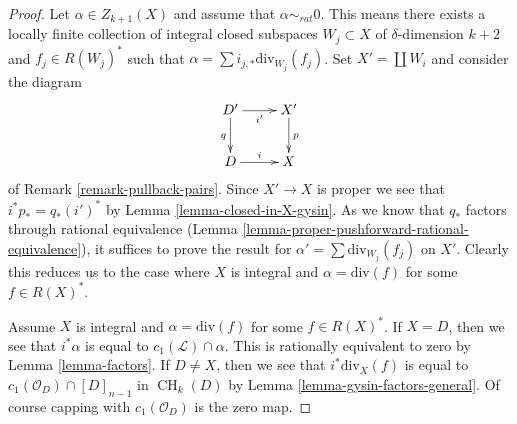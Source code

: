 \documentclass[10pt,a4paper]{amsart}
\theoremstyle{plain}
\theoremstyle{definition}
\theoremstyle{remark}
\numberwithin{equation}{subsection}
\def\CH{\mathop{\mathrm{CH}}\nolimits}
\begin{document}
\begin{proof}
Let $\alpha \in Z_{k + 1}(X)$ and assume that $\alpha \sim_{rat} 0$.
This means there exists a locally finite collection of integral
closed subspaces $W_j \subset X$ of $\delta$-dimension $k + 2$
and $f_j \in R(W_j)^*$ such that
$\alpha = \sum i_{j, *}\text{div}_{W_j}(f_j)$.
Set $X' = \coprod W_i$ and consider the diagram
$$
\xymatrix{
D' \ar[d]_q \ar[r]_{i'} & X' \ar[d]^p \\
D \ar[r]^i & X
}
$$
of Remark \ref{remark-pullback-pairs}. Since $X' \to X$ is proper
we see that $i^*p_* = q_*(i')^*$ by Lemma \ref{lemma-closed-in-X-gysin}.
As we know that $q_*$ factors through rational equivalence
(Lemma \ref{lemma-proper-pushforward-rational-equivalence}), it suffices
to prove the result for $\alpha' = \sum \text{div}_{W_j}(f_j)$
on $X'$. Clearly this reduces us to the case where $X$ is integral
and $\alpha = \text{div}(f)$ for some $f \in R(X)^*$.

\medskip\noindent
Assume $X$ is integral and $\alpha = \text{div}(f)$ for some $f \in R(X)^*$.
If $X = D$, then we see that $i^*\alpha$ is equal
to $c_1(\mathcal{L}) \cap \alpha$.
This is rationally equivalent to zero by Lemma \ref{lemma-factors}.
If $D \not = X$, then we see that $i^*\text{div}_X(f)$ is equal to
$c_1(\mathcal{O}_D) \cap [D]_{n - 1}$ in $\CH_k(D)$ by
Lemma \ref{lemma-gysin-factors-general}. Of course
capping with $c_1(\mathcal{O}_D)$ is the zero map.
\end{proof}
\end{document}
